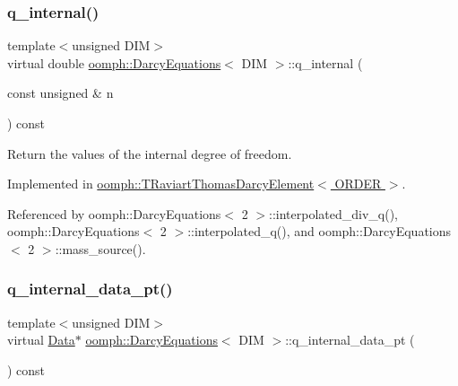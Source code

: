 \subsubsection{\texorpdfstring{q\+\_\+internal()}{q\_internal()}}
{\footnotesize\ttfamily template$<$unsigned D\+IM$>$ \\
virtual double \hyperlink{classoomph_1_1DarcyEquations}{oomph\+::\+Darcy\+Equations}$<$ D\+IM $>$\+::q\+\_\+internal (\begin{DoxyParamCaption}\item[{const unsigned \&}]{n }\end{DoxyParamCaption}) const\hspace{0.3cm}{\ttfamily [pure virtual]}}



Return the values of the internal degree of freedom. 



Implemented in \hyperlink{classoomph_1_1TRaviartThomasDarcyElement_a613264c01085a511a3c30f3f78f00c50}{oomph\+::\+T\+Raviart\+Thomas\+Darcy\+Element$<$ O\+R\+D\+E\+R $>$}.



Referenced by oomph\+::\+Darcy\+Equations$<$ 2 $>$\+::interpolated\+\_\+div\+\_\+q(), oomph\+::\+Darcy\+Equations$<$ 2 $>$\+::interpolated\+\_\+q(), and oomph\+::\+Darcy\+Equations$<$ 2 $>$\+::mass\+\_\+source().

\mbox{\label{classoomph_1_1DarcyEquations_a989dd3449cb776648590119a4b26c061}} 
\subsubsection{\texorpdfstring{q\+\_\+internal\+\_\+data\+\_\+pt()}{q\_internal\_data\_pt()}}
{\footnotesize\ttfamily template$<$unsigned D\+IM$>$ \\
virtual \hyperlink{classoomph_1_1Data}{Data}$\ast$ \hyperlink{classoomph_1_1DarcyEquations}{oomph\+::\+Darcy\+Equations}$<$ D\+IM $>$\+::q\+\_\+internal\+\_\+data\+\_\+pt (\begin{DoxyParamCaption}{ }\end{DoxyParamCaption}) const\hspace{0.3cm}{\ttfamily [pure virtual]}}



